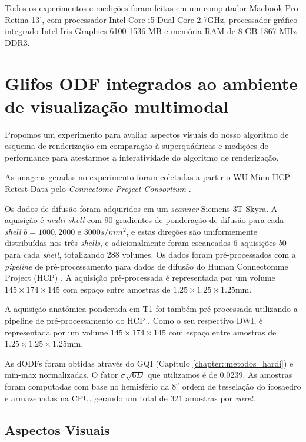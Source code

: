\documentclass[
    12pt,                %
    oneside,            %
    a4paper,            %
    english,            %
    french,                %
    spanish,            %
    brazil                %
    ]{abntex2}
\begin{document}
Todos os experimentos e medições foram feitas em um computador Macbook Pro Retina 13', com processador Intel Core i5 Dual-Core 2.7GHz, processador gráfico integrado Intel Iris Graphics 6100 1536 MB e memória RAM de 8 GB 1867 MHz DDR3.

\section{Glifos ODF integrados ao ambiente de visualização multimodal}
\label{sec::glifos_odf_visualizacao_multimodal}

Propomos um experimento para avaliar aspectos visuais do nosso algoritmo de esquema de renderização em comparação à superquádricas e medições de performance para atestarmos a interatividade do algoritmo de renderização.

As imagens geradas no experimento foram coletadas a partir o WU-Minn HCP Retest Data pelo \textit{Connectome Project Consortium} \cite{essen2012}.

Os dados de difusão foram adquiridos em um \textit{scanner} Siemens 3T Skyra. A aquisição é \textit{multi-shell} com 90 gradientes de ponderação de difusão para cada \textit{shell} $b = 1000, 2000$ e $3000 s/mm^2$, e estas direções são uniformemente distribuídas nos três \textit{shells}, e adicionalmente foram escaneados 6 aquisições $b0$ para cada \textit{shell}, totalizando 288 volumes. Os dados foram pré-processados com a \textit{pipeline} de pré-processamento para dados de difusão do Human Connectomme Project (HCP) \cite{glasser2013}. A aquisição pré-processada é representada por um volume $145\times 174\times  145$ com espaço entre amostras de $1.25\times 1.25 \times 1.25$mm.

A aquisição anatômica ponderada em T1 foi também pré-processada utilizando a pipeline de pré-processamento do HCP \cite{glasser2013}. Como o seu respectivo DWI, é representada por um volume $145\times 174\times  145$ com espaço entre amostras de $1.25\times 1.25\times 1.25$mm.

As dODFs foram obtidas através do GQI \cite{yeh2010} (Capítulo \ref{chapter::metodos_hardi}) e min-max normalizadas. O fator $\sigma \sqrt{6D}$ que utilizamos é de 0,0239. As amostras foram computadas com base no hemisfério da $8^{a}$ ordem de tesselação do icosaedro e armazenadas na CPU, gerando um total de 321 amostras por \textit{voxel}.

\subsection{Aspectos Visuais}
\label{ssec::aspectos_visuais}
\end{document}
